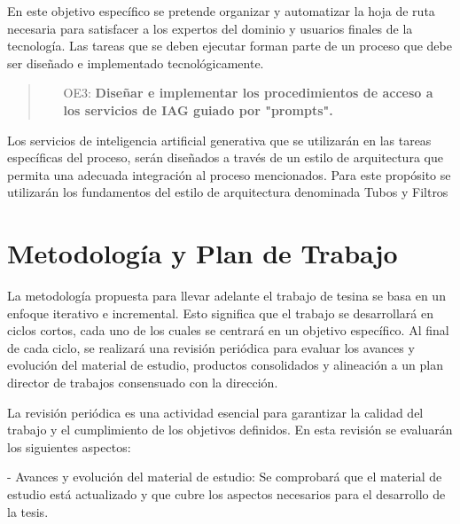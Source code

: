 \documentclass[12pt]{article}
\begin{document}
        \vspace{0.3 cm}

        En este objetivo específico se pretende organizar y automatizar la hoja de ruta necesaria para satisfacer a los expertos del dominio y usuarios finales de la tecnología. Las tareas que se deben ejecutar forman parte de un proceso que debe ser diseñado e implementado tecnológicamente.

        
        \vspace{0.3 cm}

        \begin{quote}
            \begin{itemize}
                    \item [OE3:] \textbf{Diseñar e implementar los procedimientos de acceso a los servicios de IAG guiado por "prompts".}
            \end{itemize}
        \end{quote}

        \vspace{0.3 cm}

        Los servicios de inteligencia artificial generativa que se utilizarán en las tareas específicas del proceso, serán diseñados a través de un estilo de arquitectura que permita una adecuada integración al proceso mencionados. Para este propósito se utilizarán los fundamentos del estilo de arquitectura denominada Tubos y Filtros \cite{land2002brief}
        

\section{Metodología y Plan de Trabajo}

La metodología propuesta para llevar adelante el trabajo de tesina se basa en un enfoque iterativo e incremental. Esto significa que el trabajo se desarrollará en ciclos cortos, cada uno de los cuales se centrará en un objetivo específico. Al final de cada ciclo, se realizará una revisión periódica para evaluar los avances y evolución del material de estudio, productos consolidados y alineación a un plan director de trabajos consensuado con la dirección.

La revisión periódica es una actividad esencial para garantizar la calidad del trabajo y el cumplimiento de los objetivos definidos. En esta revisión se evaluarán los siguientes aspectos:

- Avances y evolución del material de estudio: Se comprobará que el material de estudio está actualizado y que cubre los aspectos necesarios para el desarrollo de la tesis.
\end{document}
